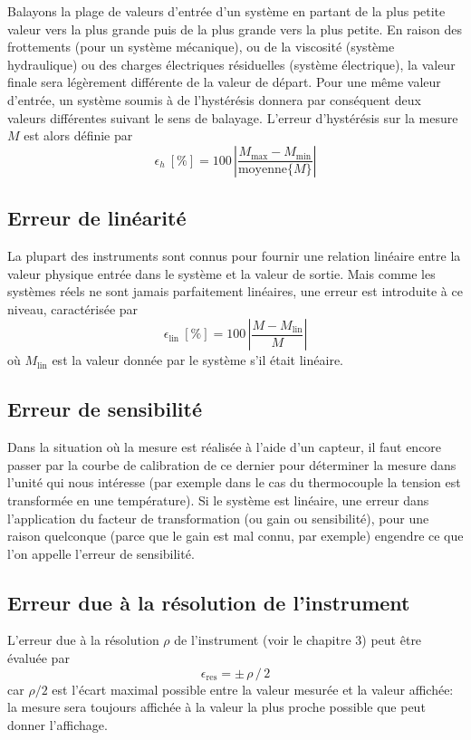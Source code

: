 Balayons la plage de valeurs d'entrée d'un système en partant de la plus petite valeur vers la plus grande puis de la plus grande vers la plus petite. En raison des frottements (pour un système mécanique), ou de la viscosité (système hydraulique) ou des charges électriques résiduelles (système électrique), la valeur finale sera légèrement différente de la valeur de départ. Pour une même valeur d'entrée, un système soumis à de l'hystérésis donnera par conséquent deux valeurs différentes suivant le sens de balayage. L'erreur d'hystérésis sur la mesure $M$ est alors définie par
$$
\epsilon_h\ [\%]=100\,\left|\frac{M_{\text{max}}-M_{\text{min}}}{\text{moyenne}\{M\}}\right|
$$

\subsection{Erreur de linéarité}

La plupart des instruments sont connus pour fournir une relation linéaire entre la valeur physique entrée dans le système et la valeur de sortie. Mais comme les systèmes réels ne sont jamais parfaitement linéaires, une erreur est introduite à ce niveau, caractérisée par
$$
\epsilon_\text{lin}\ [\%]=100\,\left|\frac{M-M_{\text{lin}}}{M}\right|
$$
où $M_{\text{lin}}$ est la valeur donnée par le système s'il était linéaire.

\subsection{Erreur de sensibilité}

Dans la situation où la mesure est réalisée à l'aide d'un capteur, il faut encore passer par la courbe de calibration de ce dernier pour déterminer la mesure dans l'unité qui nous intéresse (par exemple dans le cas du thermocouple la tension est transformée en une température). Si le système est linéaire, une erreur dans l'application du facteur de transformation (ou gain ou sensibilité), pour une raison quelconque (parce que le gain est mal connu, par exemple) engendre ce que l'on appelle l'erreur de sensibilité.

\subsection{Erreur due à la résolution de l'instrument}

L'erreur due à la résolution $\rho$ de l'instrument (voir le chapitre 3) peut être évaluée par
$$\epsilon_{\text{res}}=\pm\,\rho\,/\,2$$
car $\rho/2$ est l'écart maximal possible entre la valeur mesurée et la valeur affichée: la mesure sera toujours affichée à la valeur la plus proche possible que peut donner l'affichage.

